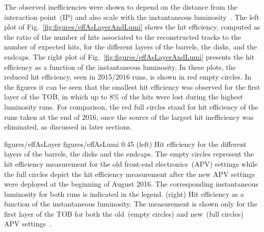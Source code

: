 The observed inefficiencies were shown to depend on the distance from the interaction point~(IP) and also scale with the instantaneous luminosity~\cite{website:hitEff}. The left plot of Fig.~\ref{fig:figures/effAsLayerAndLumi} shows the hit efficiency, computed as the ratio of the number of hits associated to the reconstructed tracks to the number of expected hits, for the different layers of the barrels, the disks, and the endcaps. The right plot of Fig.~\ref{fig:figures/effAsLayerAndLumi} presents the hit efficiency as a function of the instantaneous luminosity. In these plots, the reduced hit efficiency, seen in 2015/2016 runs, is shown in red empty circles. In the figures it can be seen that the smallest hit efficiency was observed for the first layer of the TOB, in which up to 8\% of the hits were lost during the highest luminosity runs. For comparison, the red full circles stand for hit efficiency of the runs taken at the end of 2016, once the source of the largest hit inefficiency was eliminated, as discussed in later sections.


                 {figures/effAsLayer}
                 {figures/effAsLumi} %
                 {0.45}       %
                 {(left) Hit efficiency for the different layers of the barrels, the disks and the endcaps. The empty circles represent the hit efficiency measurement for the old front-end electronics~(APV) settings while the full circles depict the hit efficiency measurement after the new APV settings were deployed at the beginning of August 2016. The corresponding instantaneous luminosity for both runs is indicated in the legend. (right) Hit efficiency as a function of the instantaneous luminosity. The measurement is shown only for the first layer of the TOB for both the old~(empty circles) and new~(full circles) APV settings~\cite{website:hitEff}. } %







